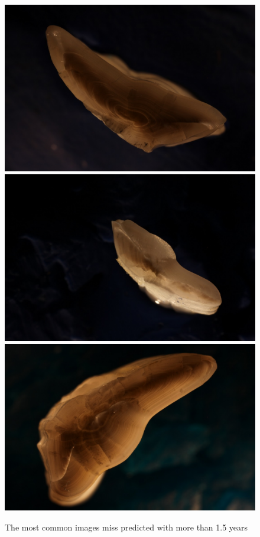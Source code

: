 \documentclass[10pt,letterpaper]{article}
\begin{document}
\begin{figure}[h!]
  \caption{The most common images miss predicted with more than 1.5 years}
  \centering
  \includegraphics[scale=0.08]{outliers/IMG_0284_13.JPG}
  \includegraphics[scale=0.08]{outliers/IMG_0230_71.JPG}
  \includegraphics[scale=0.08]{outliers/IMG_0104_270.JPG} 


\end{figure}
\end{document}
